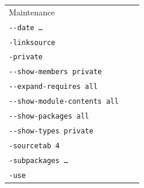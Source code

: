 \begin{longtable}{|l|l|X|}
{  Maintenance}
  & \makecell[l]{\texttt{-author}
  \\ \texttt{-{}-date …}
  \\ \texttt{-linksource}
  \\ \texttt{-private} 
  \\ \texttt{-{}-show-members private}
  \\ \texttt{-{}-expand-requires all}
  \\ \texttt{-{}-show-module-contents all}
  \\ \texttt{-{}-show-packages all}
  \\ \texttt{-{}-show-types private}
  \\ \texttt{-sourcetab 4}
  \\ \texttt{-subpackages …}
  \\ \texttt{-use}
  } \\
\hline



\end{longtable}
